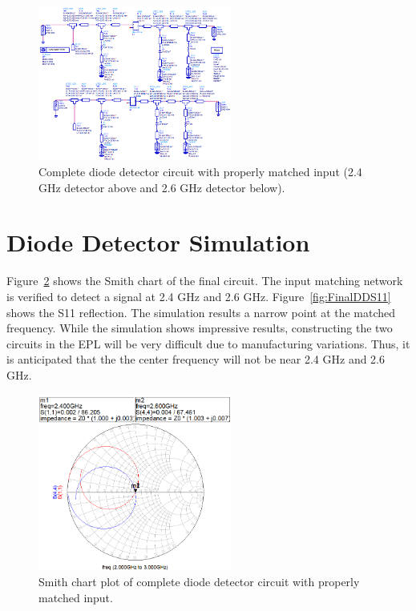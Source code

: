 \documentclass[conference]{IEEEtran}
\begin{document}
\begin{figure}[!htb]
\centering
\includegraphics[width=2.5in]{diode-pics/diodedetectorsfinalchematic.png}
\caption{Complete diode detector circuit with properly matched input (2.4 GHz detector above and 2.6 GHz detector below).}
\label{fig:FinalDDSchematic}
\end{figure}

\section{Diode Detector Simulation}
Figure~\ref{fig:FinalDDSmith} shows the Smith chart of the final circuit.  The input matching network is verified to detect a signal at 2.4 GHz and 2.6 GHz.  Figure~\ref{fig:FinalDDS11} shows the S11 reflection.  The simulation results a narrow point at the matched frequency.  While the simulation shows impressive results, constructing the two circuits in the EPL will be very difficult due to manufacturing variations.  Thus, it is anticipated that the the center frequency will not be near 2.4 GHz and 2.6 GHz.

\begin{figure}[!htb]
\centering
\includegraphics[width=2.5in]{diode-pics/diodedetectorSmithmatched-final.png}
\caption{Smith chart plot of complete diode detector circuit with properly matched input.}
\label{fig:FinalDDSmith}
\end{figure}
\end{document}
